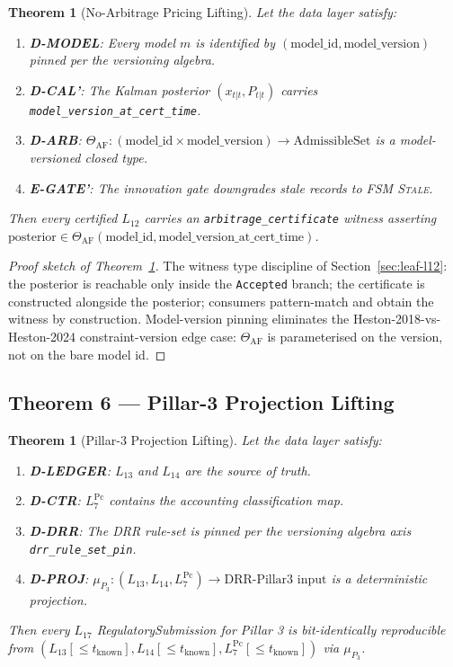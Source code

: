\documentclass[11pt,a4paper]{article}
\newtheorem{theorem}[definition]{Theorem}
\begin{document}
\begin{theorem}[No-Arbitrage Pricing Lifting]
\label{thm:no-arb}
Let the data layer satisfy:
\begin{enumerate}[nosep]
\item \textbf{D-MODEL}: Every model $m$ is identified by $(\text{model\_id}, \text{model\_version})$ pinned per the versioning algebra.
\item \textbf{D-CAL'}: The Kalman posterior $(x_{t|t}, P_{t|t})$ carries \texttt{model\_version\_at\_cert\_time}.
\item \textbf{D-ARB}: $\Theta_{\mathrm{AF}}: (\text{model\_id} \times \text{model\_version}) \to \text{AdmissibleSet}$ is a model-versioned closed type.
\item \textbf{E-GATE'}: The innovation gate downgrades stale records to FSM \textsc{Stale}.
\end{enumerate}
Then every certified $L_{12}$ carries an \texttt{arbitrage\_certificate} witness asserting $\text{posterior} \in \Theta_{\mathrm{AF}}(\text{model\_id}, \text{model\_version\_at\_cert\_time})$.
\end{theorem}

\begin{proof}[Proof sketch of Theorem~\ref{thm:no-arb}]
The witness type discipline of Section~\ref{sec:leaf-l12}: the posterior is reachable only inside the \texttt{Accepted} branch; the certificate is constructed alongside the posterior; consumers pattern-match and obtain the witness by construction. Model-version pinning eliminates the Heston-2018-vs-Heston-2024 constraint-version edge case: $\Theta_{\mathrm{AF}}$ is parameterised on the version, not on the bare model id. \qedhere
\end{proof}

\subsection{Theorem 6 --- Pillar-3 Projection Lifting}
\label{sec:thm-pillar3}

\begin{theorem}[Pillar-3 Projection Lifting]
\label{thm:pillar3}
Let the data layer satisfy:
\begin{enumerate}[nosep]
\item \textbf{D-LEDGER}: $L_{13}$ and $L_{14}$ are the source of truth.
\item \textbf{D-CTR}: $L_7^{\mathrm{Pc}}$ contains the accounting classification map.
\item \textbf{D-DRR}: The DRR rule-set is pinned per the versioning algebra axis \texttt{drr\_rule\_set\_pin}.
\item \textbf{D-PROJ}: $\mu_{P_3}: (L_{13}, L_{14}, L_7^{\mathrm{Pc}}) \to \text{DRR-Pillar3 input}$ is a deterministic projection.
\end{enumerate}
Then every $L_{17}$ RegulatorySubmission for Pillar 3 is bit-identically reproducible from $(L_{13}[\le t_{\mathrm{known}}], L_{14}[\le t_{\mathrm{known}}], L_7^{\mathrm{Pc}}[\le t_{\mathrm{known}}])$ via $\mu_{P_3}$.
\end{theorem}
\end{document}
